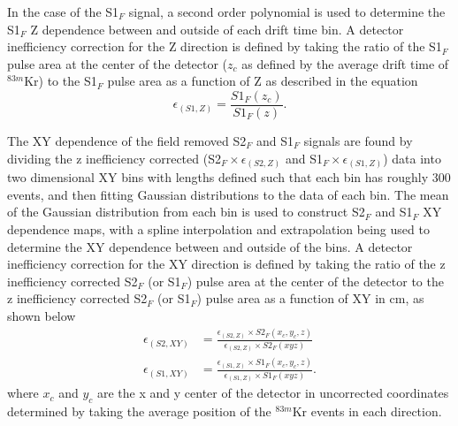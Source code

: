 \documentclass[a4paper,10pt,twocolumn]{article}
\begin{document}
In the case of the S1$_F$ signal, a second order polynomial is used to determine the S1$_F$ Z dependence between and outside of each drift time bin. A detector inefficiency correction for the Z direction is defined by taking the ratio of the S1$_F$  pulse area at the center of the detector ($z_c$ as defined by the average drift time of $^{83m}$Kr) to the S1$_F$ pulse area as a function of Z as described in the equation
\begin{equation}
\epsilon_{(S1,Z)} = \frac{S1_F(z_c)}{S1_F(z)}.
\end{equation} 


The XY dependence of the field removed S2$_F$ and S1$_F$ signals are found by dividing the z inefficiency corrected (S2$_F \times \epsilon_{(S2,Z)}$ and S1$_F \times \epsilon_{(S1,Z)}$) data into two dimensional XY bins with lengths defined such that each bin has roughly 300 events, and then fitting Gaussian distributions to the data of each bin.  The mean of the Gaussian distribution from each bin is used to construct S2$_F$ and S1$_F$ XY dependence maps, with a spline interpolation and extrapolation being used to determine the XY dependence between and outside of the bins.  A detector inefficiency correction for the XY direction is defined by taking the ratio of the z inefficiency corrected S2$_F$ (or S1$_F$) pulse area at the center of the detector to the z inefficiency corrected S2$_F$ (or S1$_F$) pulse area as a function of XY in cm, as shown below
\begin{align}
\epsilon_{(S2,XY)} &= \frac{\epsilon_{(S2,Z)} \times S2_F(x_c,y_c,z)}{\epsilon_{(S2,Z)} \times S2_F(xyz)} \\
\epsilon_{(S1,XY)} &= \frac{\epsilon_{(S1,Z)}\times S1_F(x_c,y_c,z)}{\epsilon_{(S1,Z)} \times S1_F(xyz)}.
\end{align} 
where $x_c$ and $y_c$ are the x and y center of the detector in uncorrected coordinates determined by taking the average position of the $^{83m}$Kr events in each direction.  
\end{document}
